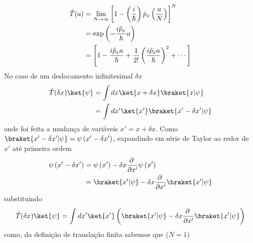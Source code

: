 \documentclass[12pt,brazil,table]{beamer}
\begin{document}
\begin{frame}
\begin{columns}[T]
  \vspace*{-1cm}
  \[
    \begin{align*}
      \hat{T}(a) &= \lim_{N\to \infty} \left[ 1- \left(\dfrac{i}{\hbar}\right)\hat{p}_x\left(\dfrac{a}{N}\right)\right]^N\\
      &= \exp\left( -\dfrac{i\hat{p}_x}{\hbar}a \right)\\
      &= \left[ 1 - \dfrac{i\hat{p}_x a}{\hbar} + \dfrac{1}{2!}\left( \dfrac{i\hat{p}_x a}{\hbar} \right)^2 + \cdots \right]
    \end{align*}\vspace*{-0.25cm}    
  \]
  No caso de um deslocamento infinitesimal $\delta x$\vspace*{-0.25cm}
  \[
    \begin{align*}
    \hat{T}(\delta x)\ket{\psi} &= \int dx \ket{x+\delta x}\braket{x|\psi}\\
    &=\int dx' \ket{x'}\braket{x'-\delta x'|\psi}
    \end{align*}\vspace*{-0.25cm}
  \]
  onde foi feita a mudança de variáveis $x'=x+\delta x$. Como $\braket{x'-\delta x'|\psi}=\psi\left(x'-\delta x'\right)$, expandindo em série de Taylor ao redor de $x'$ até primeira ordem\vspace*{-0.25cm}
  \[
    \begin{align*}
      \psi\left(x'-\delta x'\right) &= \psi \left(x'\right) - \delta x \dfrac{\partial\;}{\partial x'}\psi \left(x'\right)\\
      &= \braket{x'|\psi} - \delta x \dfrac{\partial\;}{\partial x'}\braket{x'|\psi} 
    \end{align*}\vspace*{-0.5cm}
  \]
  substituindo\vspace*{-0.25cm}
  \[
    \hat{T}(\delta x)\ket{\psi} = \int dx' \ket{x'}\left( \braket{x'|\psi} - \delta x \dfrac{\partial\;}{\partial x'}\braket{x'|\psi} \right)\vspace*{-0.25cm}
  \]
  como, da definição de translação finita sabemos que ($N=1$)

  \end{columns}

\end{frame} 


\end{document}
